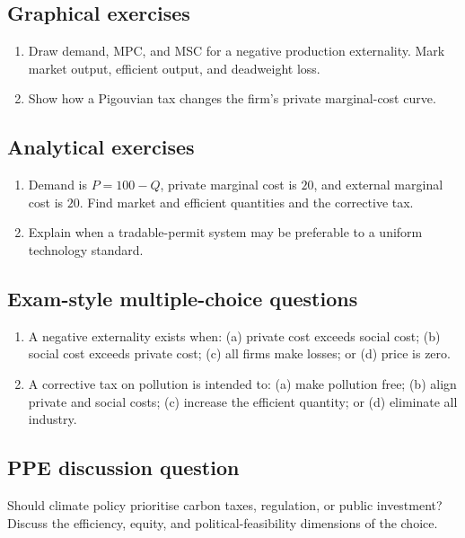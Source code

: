 \subsection*{Graphical exercises}
\begin{enumerate}[resume,label=\arabic*.]
  \item Draw demand, MPC, and MSC for a negative production externality. Mark market output, efficient output, and deadweight loss.
  \item Show how a Pigouvian tax changes the firm's private marginal-cost curve.
\end{enumerate}

\subsection*{Analytical exercises}
\begin{enumerate}[resume,label=\arabic*.]
  \item Demand is $P=100-Q$, private marginal cost is $20$, and external marginal cost is $20$. Find market and efficient quantities and the corrective tax.
  \item Explain when a tradable-permit system may be preferable to a uniform technology standard.
\end{enumerate}

\subsection*{Exam-style multiple-choice questions}
\begin{enumerate}[resume,label=\arabic*.]
  \item A negative externality exists when: (a) private cost exceeds social cost; (b) social cost exceeds private cost; (c) all firms make losses; or (d) price is zero.
  \item A corrective tax on pollution is intended to: (a) make pollution free; (b) align private and social costs; (c) increase the efficient quantity; or (d) eliminate all industry.
\end{enumerate}

\subsection*{PPE discussion question}

\noindent Should climate policy prioritise carbon taxes, regulation, or public investment? Discuss the efficiency, equity, and political-feasibility dimensions of the choice.
